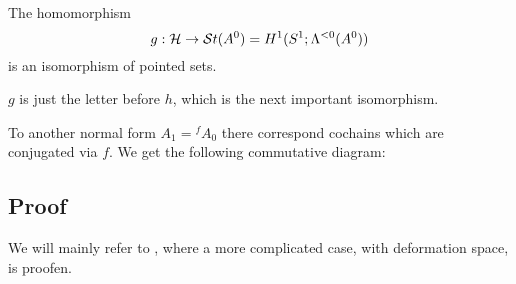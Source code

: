 \begin{tthm}
  The homomorphism
  \[
    g:\mathcal{H}\to\mathcal{S}{}t(A^0)=H^1(S^1;\Lambda^{<0}(A^0))
  \]
  is an isomorphism of pointed  sets.
  \begin{rem}
    $g$ is just the letter before $h$, which is the next important isomorphism.
  \end{rem}
\end{tthm}
\begin{rem}
  To another normal form $A_1={}^f\!A_0$ there correspond cochains which are
  conjugated via $f$.
  We get the following commutative diagram:
  \TODO{}
\end{rem}

\subsection{Proof}
We will mainly refer to \cite[section 6.d]{sabbah2007isomonodromic}, where a
more complicated case, with deformation space, is proofen.
\begin{comment}
  See also \cite{BJL1979Birkhoff} and \cite{babbitt1989local} although the proof
  goes back to work from Malgrange and Sibuya (see for example
  \cite{sibuya1990Linear}).
\end{comment}
